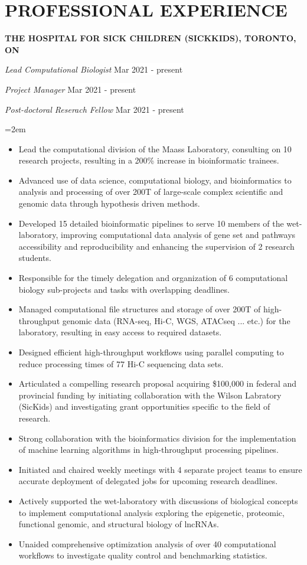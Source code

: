 \documentclass[paper=a4,fontsize=11pt]{scrartcl}	 			%
\newcommand{\NewPart}[1]{\section*{\uppercase{#1}}}
\newcommand{\EducationEntry}[4]{
		\noindent \textbf{#1} \hfill 					%
		\colorbox{White}{%
			\parbox{10em}{%
			\hfill\color{Black}#2}} \par				%
		\noindent \textit{#3} \par					%
		\noindent\hangindent=2em\hangafter=0 \small #4 	%
		\normalsize \par}
\newcommand{\WorkEntryThree}[8]{						%
		\noindent \textbf{#1} \par		%
		\noindent \textit{\noindent #2} \hfill 					%
		\noindent \colorbox{White}{\color{Black}#3} \par
		\noindent \textit{\noindent #4} \hfill 					%
		\noindent \colorbox{White}{\color{Black}#5} \par
		\noindent \textit{\noindent #6} \hfill 					%
		\noindent \colorbox{White}{\color{Black}#7} \par					%
		\noindent\hangindent=2em\hangafter=0 \small #8 	%
		\normalsize \par}
\begin{document}
\NewPart{Professional Experience}{}
\WorkEntryThree{\MakeUppercase{The Hospital For Sick Children (SickKids), Toronto, ON}}
{Lead Computational Biologist}{Mar 2021 - present}
{Project Manager}{Mar 2021 - present}
{Post-doctoral Reserach Fellow}{Mar 2021 - present}{
	\begin{itemize}
		\item Lead the computational division of the Maass Laboratory, consulting on 10 research projects, resulting in a 200\%  increase in bioinformatic trainees. 
		\item Advanced use of data science, computational biology, and bioinformatics to analysis and processing of over 200T of large-scale complex scientific and genomic data through hypothesis driven methods.
		\item Developed 15 detailed bioinformatic pipelines to serve 10 members of the wet-laboratory, improving computational data analysis of gene set and pathways accessibility and reproducibility and enhancing the supervision of 2 research students.
		\item Responsible for the timely delegation and organization of 6 computational biology sub-projects and tasks with overlapping deadlines.
		\item Managed computational file structures and storage of over 200T of high-throughput genomic data (RNA-seq, Hi-C, WGS, ATACseq ... etc.) for the laboratory, resulting in easy access to required datasets.
		\item Designed efficient high-throughput workflows using parallel computing to reduce processing times of 77 Hi-C sequencing data sets. 
		\item Articulated a compelling research proposal acquiring \$100,000 in federal and provincial funding by initiating collaboration with the Wilson Labratory (SicKids) and investigating grant opportunities specific to the field of research.
		\item Strong collaboration with the bioinformatics division for the implementation of machine learning algorithms in high-throughput processing pipelines.
		\item Initiated and chaired weekly meetings with 4 separate project teams to ensure accurate deployment of delegated jobs for upcoming research deadlines.
		\item Actively supported the wet-laboratory with discussions of biological concepts to implement computational analysis exploring the epigenetic, proteomic, functional genomic, and structural biology of lncRNAs.
		\item Unaided comprehensive optimization analysis of over 40 computational workflows to investigate quality control and benchmarking statistics. 
\end{itemize}}
\end{document}
